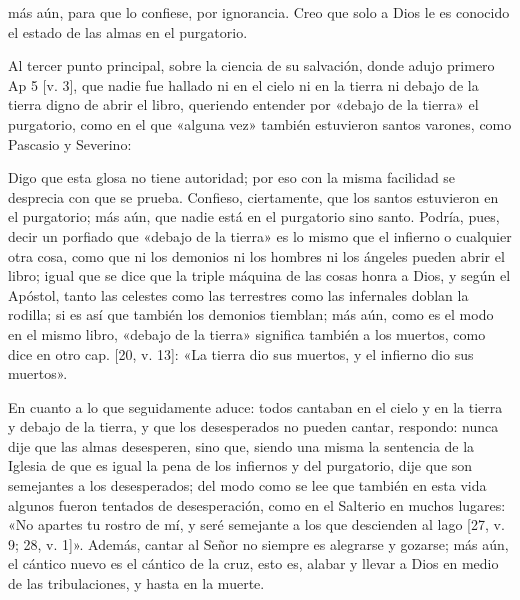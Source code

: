 más aún, para que lo confiese, por ignorancia. Creo que solo a Dios le es conocido el estado de las almas en el purgatorio.

Al tercer punto principal, sobre la ciencia de su salvación, donde adujo primero Ap 5 [v. 3], que nadie fue hallado ni en el cielo ni en la tierra ni debajo de la tierra digno de abrir el libro, queriendo entender por «debajo de la tierra» el purgatorio, como en el que «alguna vez» también estuvieron santos varones, como Pascasio y Severino:

Digo que esta glosa no tiene autoridad; por eso con la misma facilidad se desprecia con que se prueba. Confieso, ciertamente, que los santos estuvieron en el purgatorio; más aún, que nadie está en el purgatorio sino santo. Podría, pues, decir un porfiado que «debajo de la tierra» es lo mismo que el infierno o cualquier otra cosa, como que ni los demonios ni los hombres ni los ángeles pueden abrir el libro; igual que se dice que la triple máquina de las cosas honra a Dios, y según el Apóstol, tanto las celestes como las terrestres como las infernales doblan la rodilla; si es así que también los demonios tiemblan; más aún, como es el modo en el mismo libro, «debajo de la tierra» significa también a los muertos, como dice en otro cap. [20, v. 13]: «La tierra dio sus muertos, y el infierno dio sus muertos».

En cuanto a lo que seguidamente aduce: todos cantaban en el cielo y en la tierra y debajo de la tierra, y que los desesperados no pueden cantar, respondo: nunca dije que las almas desesperen, sino que, siendo una misma la sentencia de la Iglesia de que es igual la pena de los infiernos y del purgatorio, dije que son semejantes a los desesperados; del modo como se lee que también en esta vida algunos fueron tentados de desesperación, como en el Salterio en muchos lugares: «No apartes tu rostro de mí, y seré semejante a los que descienden al lago [27, v. 9; 28, v. 1]». Además, cantar al Señor no siempre es alegrarse y gozarse; más aún, el cántico nuevo es el cántico de la cruz, esto es, alabar y llevar a Dios en medio de las tribulaciones, y hasta en la muerte.


